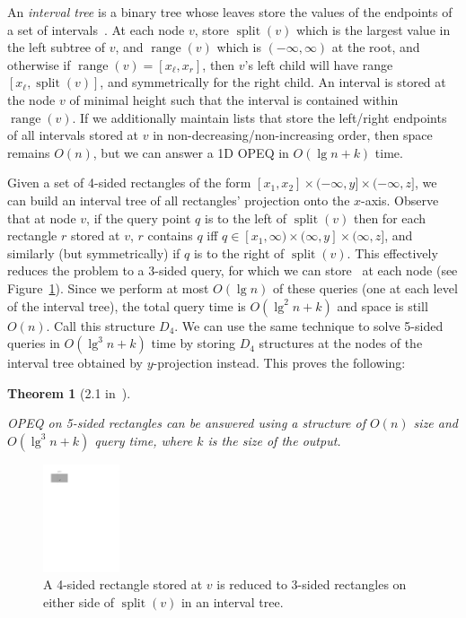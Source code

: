 \documentclass[letterpaper,12pt,twocolumn]{article}
\DeclareMathOperator{\splt}{split}
\DeclareMathOperator{\range}{range}
\newcommand{\BigOh}[1]{O\!\left(#1\right)}
\newcommand\D[1]{$D_{#1}$}
\newcommand\bounds[1]{[#1]}
\newcommand\lbounds[1]{(#1]} %
\newcommand\rbounds[1]{[#1)} %
\theoremstyle{plain}
\newtheorem{theorem}{Theorem}
\begin{document}
An \emph{interval tree} is a binary tree whose leaves store the values
of the endpoints of a set of intervals~\cite{edelsbrunner1983new}.  At
each node $v$, store $\splt(v)$ which is the largest value in the left
subtree of $v$, and $\range(v)$ which is $(-\infty,\infty)$ at the
root, and otherwise if $\range(v) = [x_\ell, x_r]$, then $v$'s left
child will have range $[x_\ell, \splt(v)]$, and symmetrically for the
right child.  An interval is stored at the node $v$ of minimal height
such that the interval is contained within $\range(v)$.  If we
additionally maintain lists that store the left/right endpoints of all
intervals stored at $v$ in non-decreasing/non-increasing order, then
space remains $\BigOh{n}$, but we can answer a 1D OPEQ in $\BigOh{\lg
  n + k}$ time.

Given a set of 4-sided rectangles of the form $\bounds{x_1,x_2} \times
\lbounds{-\infty, y} \times \lbounds{-\infty,z}$, we can build an
interval tree of all rectangles' projection onto the $x$-axis.
Observe that at node $v$, if the query point $q$ is to the left of
$\splt(v)$ then for each rectangle $r$ stored at $v$, $r$ contains $q$
iff $q \in \rbounds{x_1, \infty} \times \lbounds{\infty, y} \times
\lbounds{\infty, z}$, and similarly (but symmetrically) if $q$ is to
the right of $\splt(v)$.  This effectively reduces the problem to a
3-sided query, for which we can store~\cite{afshani2008dominance} at
each node (see Figure~\ref{fig:4sided:3sided}).  Since we perform at
most $\BigOh{\lg n}$ of these queries (one at each level of the
interval tree), the total query time is $\BigOh{\lg^2 n + k}$ and
space is still $\BigOh{n}$.  Call this structure \D{4}.  We can use
the same technique to solve 5-sided queries in $\BigOh{\lg^3 n + k}$
time by storing \D{4} structures at the nodes of the interval tree
obtained by $y$-projection instead.  This proves the following:

\begin{theorem}[2.1 in~\cite{saladi2015improved}]\label{thm:21}

  OPEQ on 5-sided rectangles can be answered using a structure of
  $\BigOh{n}$ size and $\BigOh{\lg^3 n + k}$ query time, where $k$
  is the size of the output.

\end{theorem}

\begin{figure}[t!]
  \centering
    \includegraphics[width=0.20\textwidth,page=1]{figures/4-sided-to-3-sided}
  \caption[4-sided to 3-sided]{A 4-sided rectangle stored at $v$ is
    reduced to 3-sided rectangles on either side of $\splt(v)$ in an
    interval tree.}\label{fig:4sided:3sided}
\end{figure}
\end{document}

